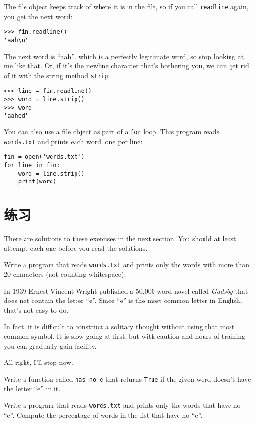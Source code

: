\documentclass[10pt]{book}
\begin{document}
The file object keeps track of where it is in the file, so
if you call {\tt readline} again, you get the next word:

\begin{verbatim}
>>> fin.readline()
'aah\n'
\end{verbatim}
%
The next word is ``aah'', which is a perfectly legitimate
word, so stop looking at me like that.
Or, if it's the newline character that's bothering you,
we can get rid of it with the string method {\tt strip}:

\begin{verbatim}
>>> line = fin.readline()
>>> word = line.strip()
>>> word
'aahed'
\end{verbatim}
%
You can also use a file object as part of a {\tt for} loop.
This program reads {\tt words.txt} and prints each word, one
per line:

\begin{verbatim}
fin = open('words.txt')
for line in fin:
    word = line.strip()
    print(word)
\end{verbatim}
%

\section{练习}

There are solutions to these exercises in the next section.
You should at least attempt each one before you read the solutions.

\begin{exercise}
Write a program that reads {\tt words.txt} and prints only the
words with more than 20 characters (not counting whitespace).

\end{exercise}

\begin{exercise}

In 1939 Ernest Vincent Wright published a 50,000 word novel called
{\em Gadsby} that does not contain the letter ``e''.  Since ``e'' is
the most common letter in English, that's not easy to do.

In fact, it is difficult to construct a solitary thought without using
that most common symbol.  It is slow going at first, but with caution
and hours of training you can gradually gain facility.

All right, I'll stop now.

Write a function called \verb"has_no_e" that returns {\tt True} if
the given word doesn't have the letter ``e'' in it.

Write a program that reads {\tt words.txt} and prints only the words
that have no ``e''.  Compute the percentage of words in the list
that have no ``e''.

\end{exercise}
\end{document}
